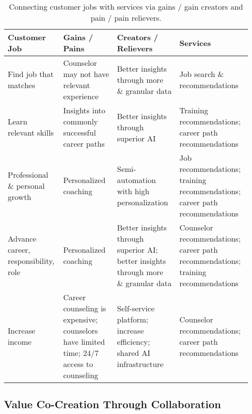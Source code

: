 \begin{table}[htb]
    \caption{
        Connecting customer jobs with services via gains / gain creators and pain / pain relievers.
    }
    \label{tab:vpc}

    \tiny
    \renewcommand{\arraystretch}{1.1}
    \small\centering
    \setlength\tabcolsep{8pt}
    \begin{tabularx}{\linewidth}{m m m m}
        \toprule
        \textbf{Customer Job} & \textbf{Gains / Pains} & \textbf{Creators / Relievers} & \textbf{Services} \\
        \toprule

        Find job that matches &
            Counselor may not have relevant experience &
            Better insights through more \& granular data &
            Job search \& recommendations\\ 
        \midrule
        
        Learn relevant skills &
            Insights into commonly successful career paths &
            Better insights through superior AI &
            Training recommendations; career path recommendations\\ 
        \midrule

        Professional \& personal growth &
            Personalized coaching &
            Semi-automation with high personalization &
            Job recommendations; training recommendations; career path recommendations\\ 
        \midrule

        Advance career, responsibility, role &
            Personalized coaching &
            Better insights through superior AI; better insights through more \& granular data&
            Counselor recommendations; career path recommendations; training recommendations \\ 
        \midrule

        Increase income &
            Career counseling is expensive; counselors have limited time; 24/7 access to counseling &
            Self-service platform; increase efficiency; shared AI infrastructure &
            Counselor recommendations; career path recommendations \\ 
        \bottomrule
    \end{tabularx}
\end{table}

\subsection{Value Co-Creation Through Collaboration}

